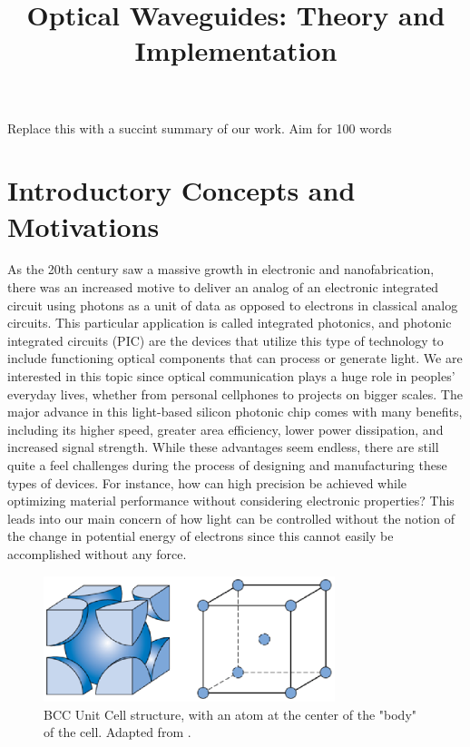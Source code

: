 \documentclass[10pt]{article}
\begin{document}
\noindent



\title{Optical Waveguides: Theory and Implementation}




\maketitle


\abstract
Replace this with a succint summary of our work. Aim for 100 words  

\section{Introductory Concepts and Motivations}

As the 20th century saw a massive growth in electronic and nanofabrication, there was an increased motive to deliver an analog of an electronic integrated circuit using photons as a unit of data as opposed to electrons in classical analog circuits. This particular application is called integrated photonics, and photonic integrated circuits (PIC) are the devices that utilize this type of technology to include functioning optical components that can process or generate light. We are interested in this topic since optical communication plays a huge role in peoples’ everyday lives, whether from personal cellphones to projects on bigger scales. The major advance in this light-based silicon photonic chip comes with many benefits, including its higher speed, greater area efficiency, lower power dissipation, and increased signal strength. While these advantages seem endless, there are still quite a feel challenges during the process of designing and manufacturing these types of devices. For instance, how can high precision be achieved while optimizing material performance without considering electronic properties? This leads into our main concern of how light can be controlled without the notion of the change in potential energy of electrons since this cannot easily be accomplished without any force.


\begin{figure}[h]
    \centering
    \includegraphics[width=8.5cm]{fig1.eps}
    \caption{\label{tab1}BCC Unit Cell structure, with an atom at the center of the "body" of the cell. Adapted from \cite{ref01}.} 
    \end{figure}
\end{document}
